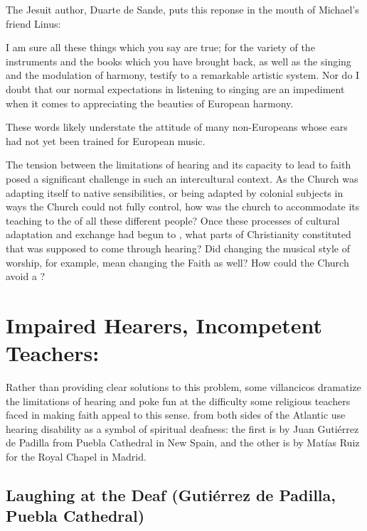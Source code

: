 The Jesuit author, Duarte de Sande, puts this reponse in the mouth of Michael's
friend Linus:
\begin{quoting}
    I am sure all these things which you say are true; for the variety of the
    instruments and the books which you have brought back, as well as the
    singing and the modulation of harmony, testify to a remarkable artistic
    system.
    Nor do I doubt that our normal expectations in listening to singing are an
    impediment when it comes to appreciating the beauties of European harmony.%
        \Autocite[156]{Massarella:JapaneseTravellers}
\end{quoting}
These words likely understate the attitude of many non-Europeans whose ears had
not yet been trained for European music.


The tension between the limitations of hearing and its capacity to lead to
faith posed a significant challenge in such an intercultural context.
As the Church was adapting itself to native sensibilities, or being adapted by
colonial subjects in ways the Church could not fully control, how was the church
to accommodate its teaching to the  of all these
different people?
Once these processes of cultural adaptation and exchange had begun to
, what parts of Christianity constituted  that
was supposed to come through hearing?
Did changing the musical style of worship, for example, mean changing the Faith
as well?
How could the Church avoid a ?

\section{Impaired Hearers, Incompetent Teachers: }

Rather than providing clear solutions to this problem, some villancicos
dramatize the limitations of hearing and poke fun at the difficulty some
religious teachers faced in making faith appeal to this sense.
 from both sides of the Atlantic use hearing
disability as a symbol of spiritual deafness: the first is by Juan Gutiérrez de
Padilla from Puebla Cathedral in New Spain, and the other is by Matías Ruiz for
the Royal Chapel in Madrid.

\subsection{Laughing at the Deaf (Gutiérrez de Padilla, Puebla Cathedral)}


